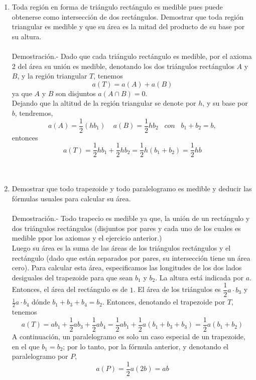 \begin{enumerate}
\begin{enumerate}[\bfseries (a)]
	    \end{enumerate}

	\item Toda región en forma de triángulo rectángulo es medible pues puede obtenerse como intersección de dos rectángulos. Demostrar que toda región triangular es medible y que su área es la mitad del producto de su base por su altura.\\\\
	    Demostración.-\; Dado que cada triángulo rectángulo es medible, por el axioma 2 del área su unión es medible, denotando los dos triángulos rectángulos $A$ y $B$, y la región triangular $T$, tenemos $$a(T)=a(A)+a(B)$$ ya que  $A$ y $B$ son disjuntos $a(A\cap B)=0$.\\
	    Dejando que la altitud de la región triangular se denote por $h$, y su base por $b$, tendremos,
	    $$a(A)=\dfrac{1}{2}(hb_1)\;\;\;\; a(B)=\dfrac{1}{2}hb_2 \;\;\; con \;\;\; b_1+b_2=b,$$ entonces $$a(T)=\dfrac{1}{2}hb_1+ \dfrac{1}{2}hb_2=\dfrac{1}{2}h(b_1+b_2)=\dfrac{1}{2}hb$$\\\\

	\item Demostrar que todo trapezoide y todo paralelogramo es medible y deducir las fórmulas usuales para calcular su área.\\\\
	    Demostración.-\; Todo trapecio es medible ya que, la unión de un rectángulo y dos triángulos rectángulos (disjuntos por pares y cada uno de los cuales es medible ppor los axiomas y el ejercicio anterior.)\\
	    Luego su área es la suma de las áreas de los triángulos rectángulos y el rectángulo (dado que están separados por pares, su intersección tiene un área cero). Para calcular esta área, especificamos las longitudes de los dos lados desiguales del trapezoide para que sean $b_1$ y $b_2$. La altura está indicada por $a$. Entonces, el área del rectángulo es de $1$. El área de los triángulos es $\dfrac{1}{2} a \cdot b_3$ y $\frac{1}{2} a \cdot b_4$ dónde $b_1 + b_3 + b_4 = b_2$. Entonces, denotando el trapezoide por $T$, tenemos $$a(T)=ab_1+\dfrac{1}{2}ab_3 + \dfrac{1}{2}ab_4=\dfrac{1}{2}ab_1 + \dfrac{1}{2}a(b_1 + b_3 + b_3)=\dfrac{1}{2}a(b_1+b_2)$$ A continuación, un paralelogramo es solo un caso especial de un trapezoide, en el que $b_1 = b_2$; por lo tanto, por la fórmula anterior, y denotando el paralelogramo por $P$, $$a(P)=\dfrac{1}{2}a(2b)=ab$$\\\\


\end{enumerate}
